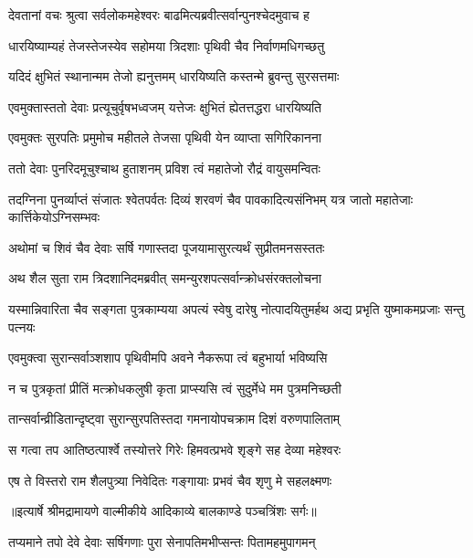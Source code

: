 \twolineshloka
{देवतानां वचः श्रुत्वा सर्वलोकमहेश्वरः}
{बाढमित्यब्रवीत्सर्वान्पुनश्चेदमुवाच ह} %

\twolineshloka
{धारयिष्याम्यहं तेजस्तेजस्येव सहोमया}
{त्रिदशाः पृथिवी चैव निर्वाणमधिगच्छतु} %

\twolineshloka
{यदिदं क्षुभितं स्थानान्मम तेजो ह्यनुत्तमम्}
{धारयिष्यति कस्तन्मे ब्रुवन्तु सुरसत्तमाः} %

\twolineshloka
{एवमुक्तास्ततो देवाः प्रत्यूचुर्वृषभध्वजम्}
{यत्तेजः क्षुभितं ह्येतत्तद्धरा धारयिष्यति} %

\twolineshloka
{एवमुक्तः सुरपतिः प्रमुमोच महीतले}
{तेजसा पृथिवी येन व्याप्ता सगिरिकानना} %

\twolineshloka
{ततो देवाः पुनरिदमूचुश्चाथ हुताशनम्}
{प्रविश त्वं महातेजो रौद्रं वायुसमन्वितः} %

\threelineshloka
{तदग्निना पुनर्व्याप्तं संजातः श्वेतपर्वतः}
{दिव्यं शरवणं चैव पावकादित्यसंनिभम्}
{यत्र जातो महातेजाः कार्त्तिकेयोऽग्निसम्भवः} %

\twolineshloka
{अथोमां च शिवं चैव देवाः सर्षि गणास्तदा}
{पूजयामासुरत्यर्थं सुप्रीतमनसस्ततः} %

\twolineshloka
{अथ शैल सुता राम त्रिदशानिदमब्रवीत्}
{समन्युरशपत्सर्वान्क्रोधसंरक्तलोचना} %

\threelineshloka
{यस्मान्निवारिता चैव सङ्गता पुत्रकाम्यया}
{अपत्यं स्वेषु दारेषु नोत्पादयितुमर्हथ}
{अद्य प्रभृति युष्माकमप्रजाः सन्तु पत्नयः} %

\twolineshloka
{एवमुक्त्वा सुरान्सर्वाञ्शशाप पृथिवीमपि}
{अवने नैकरूपा त्वं बहुभार्या भविष्यसि} %

\twolineshloka
{न च पुत्रकृतां प्रीतिं मत्क्रोधकलुषी कृता}
{प्राप्स्यसि त्वं सुदुर्मेधे मम पुत्रमनिच्छती} %

\twolineshloka
{तान्सर्वान्व्रीडितान्दृष्ट्वा सुरान्सुरपतिस्तदा}
{गमनायोपचक्राम दिशं वरुणपालिताम्} %

\twolineshloka
{स गत्वा तप आतिष्ठत्पार्श्वे तस्योत्तरे गिरेः}
{हिमवत्प्रभवे शृङ्गे सह देव्या महेश्वरः} %

\twolineshloka
{एष ते विस्तरो राम शैलपुत्र्या निवेदितः}
{गङ्गायाः प्रभवं चैव शृणु मे सहलक्ष्मणः} %


{॥इत्यार्षे श्रीमद्रामायणे वाल्मीकीये आदिकाव्ये बालकाण्डे पञ्चत्रिंशः सर्गः॥}


\twolineshloka
{तप्यमाने तपो देवे देवाः सर्षिगणाः पुरा}
{सेनापतिमभीप्सन्तः पितामहमुपागमन्} %

